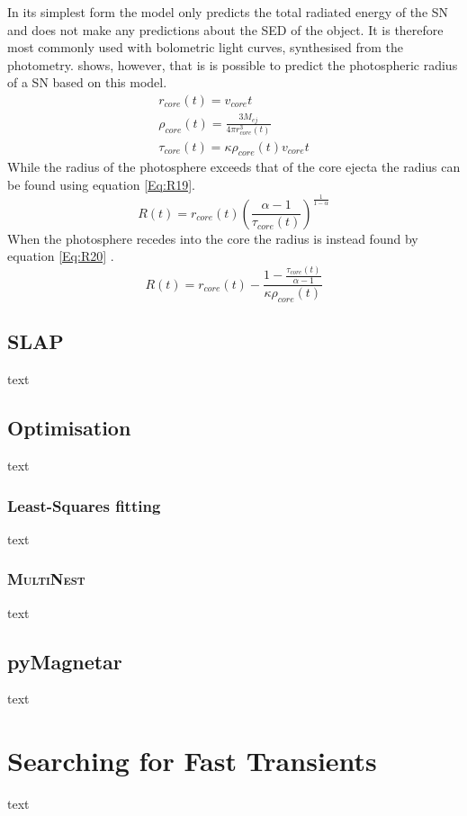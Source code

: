 In its simplest form the model only predicts the total radiated energy of the SN and does not make any predictions about the SED of the object. It is therefore most commonly used with bolometric light curves, synthesised from the photometry. \cite{2013ApJ...770..128I} shows, however, that is is possible to predict the photospheric radius of a SN based on this model.
\begin{align}
r_{core}(t) = v_{core}  t \\
\rho_{core}(t)= \frac{3 M_{ej}}{4  \pi  r_{core}^3(t)}\\
\tau_{core}(t) = \kappa  \rho_{core}(t) v_{core} t
\end{align}
While the radius of the photosphere exceeds that of the core ejecta the radius can be found using equation \ref{Eq:R19}.
\begin{equation}
\label{Eq:R19}
R(t) = r_{core}(t) \left(\frac{\alpha - 1}{\tau_{core}(t)}\right)^\frac{1}{1 - \alpha}
\end{equation}
When the photosphere recedes into the core the radius is instead found by equation \ref{Eq:R20} \citep{2013ApJ...770..128I}.
\begin{equation}
\label{Eq:R20}
R(t) = r_{core}(t) - \frac{1 - \frac{\tau_{core}(t)}{\alpha - 1}}{\kappa \rho_{core}(t)}
\end{equation}

\subsection{SLAP}
text
\subsection{Optimisation}
text
\subsubsection{Least-Squares fitting}
text
\subsubsection{\textsc{MultiNest}}
text
\subsection{pyMagnetar}
text

\section{Searching for Fast Transients}
text
